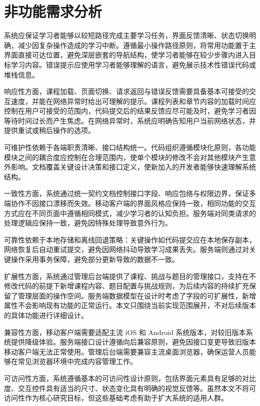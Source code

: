 \section{非功能需求分析}

系统应保证学习者能够以较短路径完成主要学习任务，界面反馈清晰、状态切换明确，减少因复杂操作造成的学习中断。遵循最小操作路径原则，将常用功能置于主界面直接可达位置，避免深层嵌套的导航结构，使学习者能够在较少步骤内进入目标学习内容。错误提示应使用学习者能够理解的语言，避免展示技术性错误代码或堆栈信息\cite{heines2001,guo2013}。

响应性方面，课程加载、页面切换、请求返回与错误反馈需要具备基本可接受的交互速度，并能在网络异常时给出可理解的提示。课程列表和章节内容的加载时间应控制在用户可接受的范围内，代码提交后的结果反馈应尽可能及时，避免学习者因等待时间过长而产生焦虑。在网络异常时，系统应明确告知用户当前网络状态，并提供重试或稍后操作的选项。

可维护性依赖于各端职责清晰、接口结构统一。代码组织遵循模块化原则，各功能模块之间的耦合度应控制在合理范围内，使单个模块的修改不会对其他模块产生意外影响。文档覆盖关键设计决策和接口定义，使新加入的开发者能够快速理解系统结构。

一致性方面，系统通过统一契约文档控制接口字段、响应包络与权限边界，保证多端协作不因接口漂移而失效。移动客户端的界面风格应保持一致，相同功能的交互方式应在不同页面中遵循相同模式，减少学习者的认知负担。服务端对同类请求的处理逻辑应保持一致，避免因特殊处理导致意外行为。

可靠性依赖于本地存储和离线回退策略：关键操作如代码提交应在本地保存副本，网络恢复后自动重试提交，避免因网络抖动导致学习成果丢失。服务端则通过对关键操作采用事务保障，避免部分更新导致的数据不一致。

扩展性方面，系统通过管理后台端提供了课程、挑战与题目的管理接口，支持在不修改代码的前提下新增课程内容、题目配置与挑战规则，为后续内容的持续扩充保留了管理层面的操作空间。服务端数据模型在设计时考虑了字段的可扩展性，新增属性不会影响现有功能的正常运行。本文只围绕当前实现范围展开，不对后续版本的具体功能进行详细设计\cite{sommerville2015}。

兼容性方面，移动客户端需要适配主流 iOS 和 Android 系统版本，对较旧版本系统提供降级体验。服务端接口设计遵循向后兼容原则，避免因接口变更导致旧版本移动客户端无法正常使用。管理后台端需要兼容主流桌面浏览器，确保运营人员能够在常见浏览器环境中完成内容管理工作。

可访问性方面，系统遵循基本的可访问性设计原则，包括界面元素具有足够的对比度、交互控件具有适当的尺寸、状态变化具有明确的视觉反馈等。虽然本文不将可访问性作为核心研究目标，但这些基础考虑有助于扩大系统的适用人群。


